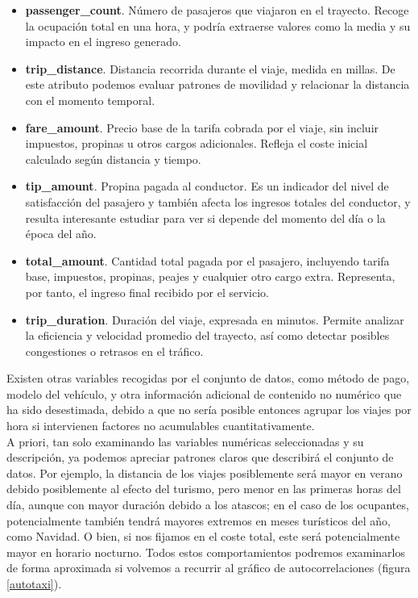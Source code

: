 \begin{itemize}
	\item \textbf{passenger\_count}. Número de pasajeros que viajaron en el trayecto. Recoge la ocupación total en una hora, y podría extraerse valores como la media y su impacto en el ingreso generado.
	
	\item \textbf{trip\_distance}. Distancia recorrida durante el viaje, medida en millas. De este atributo podemos evaluar patrones de movilidad y relacionar la distancia con el momento temporal.
	
	\item \textbf{fare\_amount}. Precio base de la tarifa cobrada por el viaje, sin incluir impuestos, propinas u otros cargos adicionales. Refleja el coste inicial calculado según distancia y tiempo.
	
	\item \textbf{tip\_amount}. Propina pagada al conductor. Es un indicador del nivel de satisfacción del pasajero y también afecta los ingresos totales del conductor, y resulta interesante estudiar para ver si depende del momento del día o la época del año.
	
	\item \textbf{total\_amount}. Cantidad total pagada por el pasajero, incluyendo tarifa base, impuestos, propinas, peajes y cualquier otro cargo extra. Representa, por tanto, el ingreso final recibido por el servicio.
	
	\item \textbf{trip\_duration}. Duración del viaje, expresada en minutos. Permite analizar la eficiencia y velocidad promedio del trayecto, así como detectar posibles congestiones o retrasos en el tráfico.
\end{itemize}

Existen otras variables recogidas por el conjunto de datos, como método de pago, modelo del vehículo, y otra información adicional de contenido no numérico que ha sido desestimada, debido a que no sería posible entonces agrupar los viajes por hora si intervienen factores no acumulables cuantitativamente.\\

A priori, tan solo examinando las variables numéricas seleccionadas y su descripción, ya podemos apreciar patrones claros que describirá el conjunto de datos. Por ejemplo, la distancia de los viajes posiblemente será mayor en verano debido posiblemente al efecto del turismo, pero menor en las primeras horas del día, aunque con mayor duración debido a los atascos; en el caso de los ocupantes, potencialmente también tendrá mayores extremos en meses turísticos del año, como Navidad. O bien, si nos fijamos en el coste total, este será potencialmente mayor en horario nocturno. Todos estos comportamientos podremos examinarlos de forma aproximada si volvemos a recurrir al gráfico de autocorrelaciones (figura  \ref{autotaxi}).\\
	
